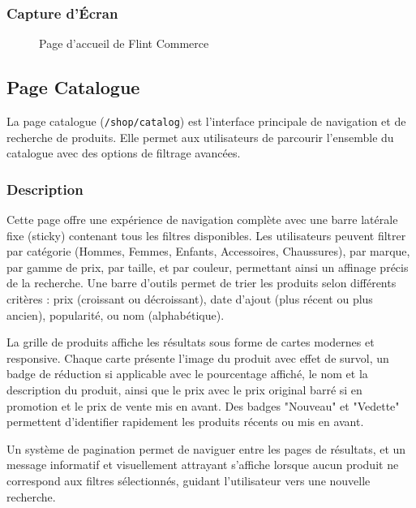 \documentclass[12pt,a4paper]{article}
\begin{document}
\subsubsection{Capture d'Écran}

\begin{figure}[H]
    \centering
    \caption{Page d'accueil de Flint Commerce}
    \label{fig:home}
\end{figure}

\subsection{Page Catalogue}

La page catalogue (\texttt{/shop/catalog}) est l'interface principale de navigation et de recherche de produits. Elle permet aux utilisateurs de parcourir l'ensemble du catalogue avec des options de filtrage avancées.

\subsubsection{Description}

Cette page offre une expérience de navigation complète avec une barre latérale fixe (sticky) contenant tous les filtres disponibles. Les utilisateurs peuvent filtrer par catégorie (Hommes, Femmes, Enfants, Accessoires, Chaussures), par marque, par gamme de prix, par taille, et par couleur, permettant ainsi un affinage précis de la recherche. Une barre d'outils permet de trier les produits selon différents critères : prix (croissant ou décroissant), date d'ajout (plus récent ou plus ancien), popularité, ou nom (alphabétique).

La grille de produits affiche les résultats sous forme de cartes modernes et responsive. Chaque carte présente l'image du produit avec effet de survol, un badge de réduction si applicable avec le pourcentage affiché, le nom et la description du produit, ainsi que le prix avec le prix original barré si en promotion et le prix de vente mis en avant. Des badges "Nouveau" et "Vedette" permettent d'identifier rapidement les produits récents ou mis en avant.

Un système de pagination permet de naviguer entre les pages de résultats, et un message informatif et visuellement attrayant s'affiche lorsque aucun produit ne correspond aux filtres sélectionnés, guidant l'utilisateur vers une nouvelle recherche.
\end{document}
